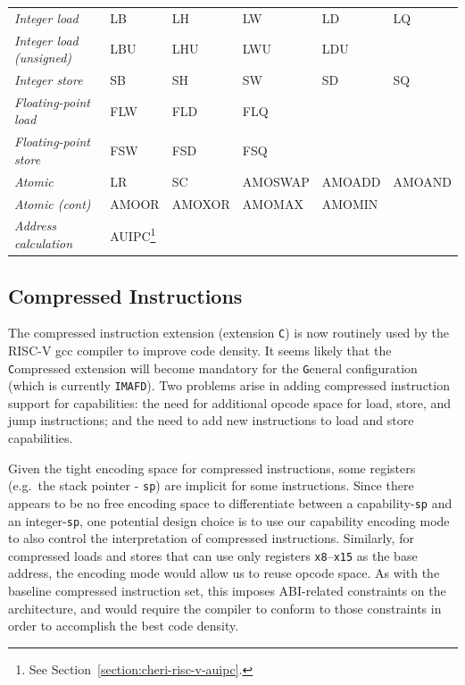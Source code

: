 \begin{savenotes}
\begin{tabular}{llllll}
\textit{Integer load} & LB & LH & LW & LD & LQ \\
\textit{Integer load (unsigned)} & LBU & LHU & LWU & LDU & \\
\textit{Integer store} & SB & SH & SW & SD & SQ \\
\textit{Floating-point load} & FLW & FLD & FLQ & & \\
\textit{Floating-point store} & FSW & FSD & FSQ & & \\
\textit{Atomic} & LR & SC & AMOSWAP & AMOADD & AMOAND \\
\textit{Atomic (cont)} & AMOOR & AMOXOR & AMOMAX & AMOMIN & \\
\textit{Address calculation} & AUIPC\footnote{See Section~\ref{section:cheri-risc-v-auipc}.} & & & & \\
\end{tabular}
\end{savenotes}

\subsection{Compressed Instructions}
\label{subsection:compressed-instructions}


The compressed instruction extension (extension \texttt{C}) is now
routinely used by the RISC-V gcc compiler to improve code density.  It seems
likely that the \texttt{C}ompressed extension will become mandatory for
the \texttt{G}eneral configuration (which is currently
\texttt{IMAFD}).
Two problems arise in adding compressed instruction support for capabilities:
the need for additional opcode space for load, store, and jump instructions;
and the need to add new instructions to load and store capabilities.

Given the tight encoding space for compressed instructions, some
registers (e.g.~the stack pointer - \texttt{sp}) are implicit for some
instructions.  Since there appears to be no free encoding space to
differentiate between a capability-\texttt{sp} and an
integer-\texttt{sp}, one potential design choice is to use our capability
encoding mode to also control the interpretation of compressed instructions.
Similarly, for compressed loads and
stores that can use only registers \texttt{x8}--\texttt{x15} as the
base address, the encoding mode would allow us to reuse opcode space.
As with the baseline compressed instruction set, this imposes ABI-related
constraints on the architecture, and would require the compiler to conform to
those constraints in order to accomplish the best code density.


